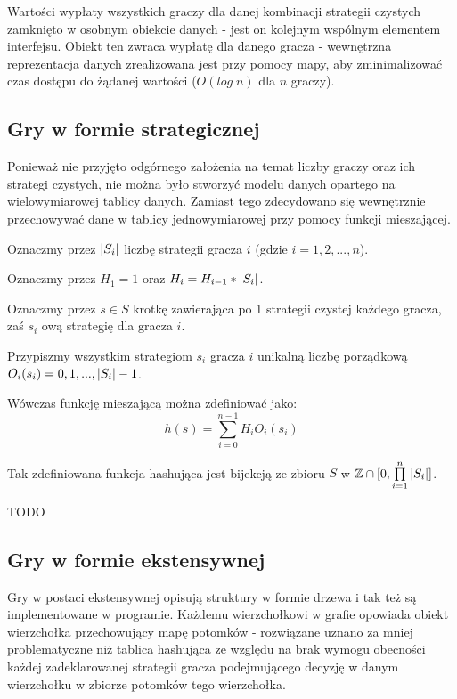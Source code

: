 \documentclass{standalone}
\begin{document}
Wartości wypłaty wszystkich graczy dla danej kombinacji strategii czystych zamknięto w osobnym obiekcie
danych - jest on kolejnym wspólnym elementem interfejsu. Obiekt ten zwraca wypłatę dla danego gracza -
wewnętrzna reprezentacja danych zrealizowana jest przy pomocy mapy, aby zminimalizować czas dostępu do
żądanej wartości ($O(log\;n)$ dla $n$ graczy).

\subsection{Gry w formie strategicznej}

Ponieważ nie przyjęto odgórnego założenia na temat liczby graczy oraz ich strategi czystych, nie można było
stworzyć modelu danych opartego na wielowymiarowej tablicy danych. Zamiast tego zdecydowano się wewnętrznie
przechowywać dane w tablicy jednowymiarowej przy pomocy funkcji mieszającej.

Oznaczmy przez $|S_i|$ liczbę strategii gracza $i$ (gdzie $i = 1, 2, ..., n$).

Oznaczmy przez $H_1 = 1$ oraz $H_i = H_{i-1} * |S_i|$.

Oznaczmy przez $s \in S$ krotkę zawierająca po 1 strategii czystej każdego gracza, zaś $s_i$ ową strategię
dla gracza $i$.

Przypiszmy wszystkim strategiom $s_i$ gracza $i$ unikalną liczbę porządkową $O_i(s_i) = 0, 1, ..., |S_i|-1$.

Wówczas funkcję mieszającą można zdefiniować jako:
$$h(s) = \sum\limits_{i=0}^{n-1} H_i O_i(s_i)$$

\begin{theorem}
Tak zdefiniowana funkcja hashująca jest bijekcją ze zbioru $S$ w $ \mathbb{Z} \cap [0, \prod\limits_{i=1}^{n} |S_i|] $.
\end{theorem}

TODO

\subsection{Gry w formie ekstensywnej}

Gry w postaci ekstensywnej opisują struktury w formie drzewa i tak też są implementowane w programie. Każdemu
wierzchołkowi w grafie opowiada obiekt wierzchołka przechowujący mapę potomków - rozwiązane uznano za mniej problematyczne
niż tablica hashująca ze względu na brak wymogu obecności każdej zadeklarowanej strategii gracza podejmującego decyzję w danym
wierzchołku w zbiorze potomków tego wierzchołka.
\end{document}
